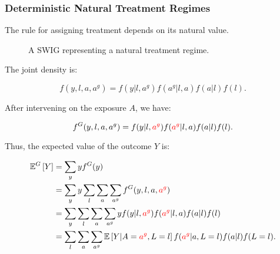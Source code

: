 \documentclass[12pt,twoside]{article}
\begin{document}
\subsubsection{Deterministic Natural Treatment Regimes}
The rule for assigning treatment depends on its natural value.

\begin{figure}[ht]
\centering
{}
\caption{A SWIG representing a natural treatment regime.}
\label{fig:swig_det_nat_inv}
\end{figure}

The joint density is:

\begin{equation}
    f(y,l,a,a^g) = f(y|l,a^g) f(a^g|l,a) f(a|l) f(l).
\end{equation}

After intervening on the exposure $A$, we have:

\begin{equation}
    f^G(y,l,a,a^g) = f(y|l,\textcolor{red}{a^g}) f(\textcolor{red}{a^g}|l,a) f(a|l) f(l).
\end{equation}

Thus, the expected value of the outcome $Y$ is:

\begin{align}
    \mathbb{E}^G \left[ Y \right] &= \sum_y y f^G(y) \\
    &= \sum_y y \sum_l \sum_a \sum_{a^g} f^G(y,l,a,\textcolor{red}{a^g}) \\
    &= \sum_y \sum_l \sum_a \sum_{a^g} y f(y|l,\textcolor{red}{a^g}) f(\textcolor{red}{a^g}|l,a) f(a|l) f(l) \\
    &= \sum_l \sum_a \sum_{a^g} \mathbb{E} \left[ Y|A=\textcolor{red}{a^g},L=l\right] f(\textcolor{red}{a^g}|a,L=l) f(a|l) f(L=l).
\end{align}
\end{document}
